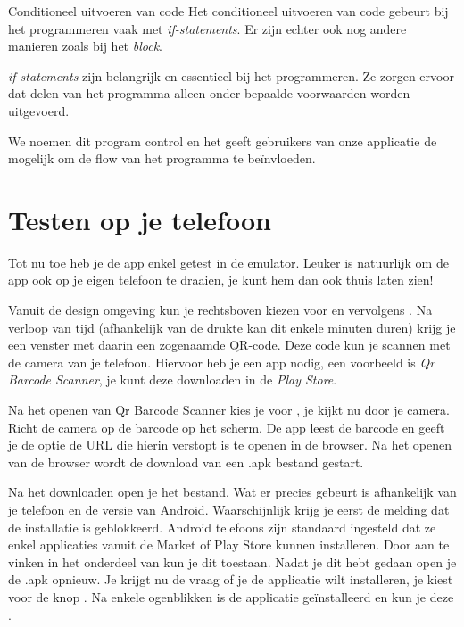 \begin{derivation}{Conditioneel uitvoeren van code}
Het conditioneel uitvoeren van code gebeurt bij het programmeren vaak met \emph{if-statements}. Er zijn echter ook nog andere manieren zoals bij \ai het  \emph{block}.

\emph{if-statements} zijn belangrijk en essentieel bij het programmeren. Ze zorgen ervoor dat delen van het programma alleen onder bepaalde voorwaarden worden uitgevoerd.

We noemen dit program control en het geeft gebruikers van onze applicatie de mogelijk om de flow van het programma te be\"invloeden.
\end{derivation}


\section{Testen op je telefoon}
\runOpTelefoon{} Tot nu toe heb je de app enkel getest in de emulator. Leuker is natuurlijk om de app ook op je eigen telefoon te draaien, je kunt hem dan ook thuis laten zien!

Vanuit de design omgeving kun je rechtsboven kiezen voor  en vervolgens . Na verloop van tijd (afhankelijk van de drukte kan dit enkele minuten duren) krijg je een venster met daarin een zogenaamde QR-code. Deze code kun je scannen met de camera van je telefoon. Hiervoor heb je een app nodig, een voorbeeld is \emph{Qr Barcode Scanner}, je kunt deze downloaden in de \emph{Play Store}.

Na het openen van Qr Barcode Scanner kies je voor , je kijkt nu door je camera. Richt de camera op de barcode op het scherm. De app leest de barcode en geeft je de optie de URL die hierin verstopt is te openen in de browser. Na het openen van de browser wordt de download van een .apk bestand gestart. 

Na het downloaden open je het bestand. Wat er precies gebeurt is afhankelijk van je telefoon en de versie van Android. Waarschijnlijk krijg je eerst de melding dat de installatie is geblokkeerd. Android telefoons zijn standaard ingesteld dat ze enkel applicaties vanuit de Market of Play Store kunnen installeren. Door  aan te vinken in het  onderdeel van  kun je dit toestaan. Nadat je dit hebt gedaan open je de .apk opnieuw. Je krijgt nu de vraag of je de applicatie wilt installeren, je kiest voor de knop . Na enkele ogenblikken is de applicatie ge\"installeerd en kun je deze . 

